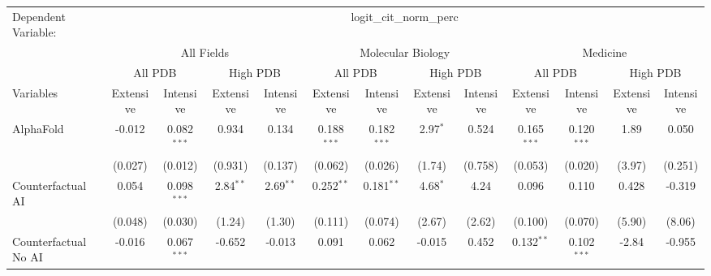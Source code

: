 \begingroup
\centering
\begin{tabular}{lcccccccccccc}
   \tabularnewline \midrule \midrule
   Dependent Variable: & \multicolumn{12}{c}{logit\_cit\_norm\_perc}\\
 & \multicolumn{4}{c}{All Fields} & \multicolumn{4}{c}{Molecular Biology} & \multicolumn{4}{c}{Medicine} \\
\cmidrule(lr){2-5} \cmidrule(lr){6-9} \cmidrule(lr){10-13}
 & \multicolumn{2}{c}{All PDB} & \multicolumn{2}{c}{High PDB} & \multicolumn{2}{c}{All PDB} & \multicolumn{2}{c}{High PDB} & \multicolumn{2}{c}{All PDB} & \multicolumn{2}{c}{High PDB} \\
\cmidrule(lr){2-3} \cmidrule(lr){4-5} \cmidrule(lr){6-7} \cmidrule(lr){8-9} \cmidrule(lr){10-11} \cmidrule(lr){12-13}
Variables & \multicolumn{1}{c}{Extensive} & \multicolumn{1}{c}{Intensive} & \multicolumn{1}{c}{Extensive} & \multicolumn{1}{c}{Intensive} & \multicolumn{1}{c}{Extensive} & \multicolumn{1}{c}{Intensive} & \multicolumn{1}{c}{Extensive} & \multicolumn{1}{c}{Intensive} & \multicolumn{1}{c}{Extensive} & \multicolumn{1}{c}{Intensive} & \multicolumn{1}{c}{Extensive} & \multicolumn{1}{c}{Intensive} \\
\cmidrule(lr){1-1}\cmidrule(lr){2-2} \cmidrule(lr){3-3} \cmidrule(lr){4-4} \cmidrule(lr){5-5} \cmidrule(lr){6-6} \cmidrule(lr){7-7} \cmidrule(lr){8-8} \cmidrule(lr){9-9} \cmidrule(lr){10-10} \cmidrule(lr){11-11} \cmidrule(lr){12-12} \cmidrule(lr){13-13}
   AlphaFold                                & -0.012       & 0.082$^{***}$  & 0.934       & 0.134       & 0.188$^{***}$ & 0.182$^{***}$ & 2.97$^{*}$  & 0.524   & 0.165$^{***}$ & 0.120$^{***}$  & 1.89   & 0.050\\   
                                            & (0.027)      & (0.012)        & (0.931)     & (0.137)     & (0.062)       & (0.026)       & (1.74)      & (0.758) & (0.053)       & (0.020)        & (3.97) & (0.251)\\   
   Counterfactual AI                        & 0.054        & 0.098$^{***}$  & 2.84$^{**}$ & 2.69$^{**}$ & 0.252$^{**}$  & 0.181$^{**}$  & 4.68$^{*}$  & 4.24    & 0.096         & 0.110          & 0.428  & -0.319\\   
                                            & (0.048)      & (0.030)        & (1.24)      & (1.30)      & (0.111)       & (0.074)       & (2.67)      & (2.62)  & (0.100)       & (0.070)        & (5.90) & (8.06)\\   
   Counterfactual No AI                     & -0.016       & 0.067$^{***}$  & -0.652      & -0.013      & 0.091         & 0.062         & -0.015      & 0.452   & 0.132$^{**}$  & 0.102$^{***}$  & -2.84  & -0.955\\   

\end{tabular}
